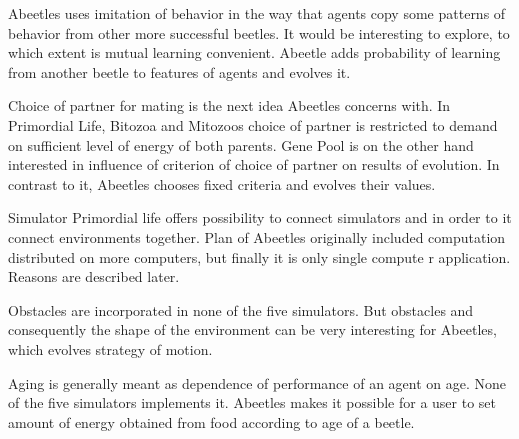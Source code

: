 \documentclass[a4paper,12pt]{report}
\begin{document}
Abeetles uses imitation of behavior in the way that agents copy some patterns of behavior from other more successful beetles. It would be interesting to explore, to which extent is mutual learning convenient. Abeetle adds probability of learning from another beetle to features of agents and evolves it.

Choice of partner for mating is the next idea Abeetles concerns with. In Primordial Life, Bitozoa and Mitozoos choice of partner is restricted to demand on sufficient level of energy of both parents. Gene Pool is on the other hand interested in influence of criterion of choice of partner on results of evolution. \cite{GenePool2} In contrast to it, Abeetles chooses fixed criteria and evolves their values.   

Simulator Primordial life offers possibility to connect simulators and in order to it connect environments together. Plan of Abeetles originally included computation distributed on more computers, but finally it is only single compute r application. Reasons are described later. 

Obstacles are incorporated in none of the five simulators. But obstacles and consequently the shape of the environment can be very interesting for Abeetles, which evolves strategy of motion.  

Aging is generally meant as dependence of performance of an agent on age. None of the five simulators implements it. Abeetles makes it possible for a user to set amount of energy obtained from food according to age of a beetle.





\end{document}
